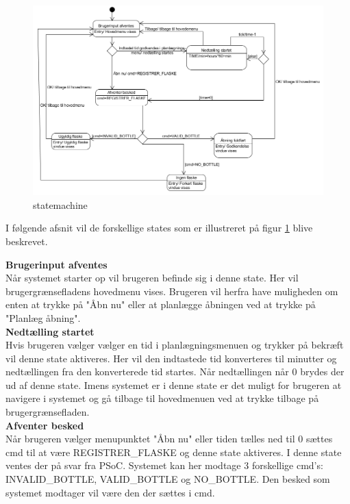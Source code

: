 \begin{figure}[H]
	\centerline{\includegraphics[scale=1]{tex/Design/GUI/Fotos/sm}}
	\caption{statemachine}
	\label{sm}
\end{figure}

I følgende afsnit vil de forskellige states som er illustreret på figur \ref{sm} blive beskrevet.

\textbf{Brugerinput afventes}\\
Når systemet starter op vil brugeren befinde sig i denne state. Her vil brugergrænsefladens hovedmenu vises. Brugeren vil herfra have muligheden om enten at trykke på "Åbn nu" eller at planlægge åbningen ved at trykke på "Planlæg åbning".\\

\textbf{Nedtælling startet}\\
Hvis brugeren vælger vælger en tid i planlægningsmenuen og trykker på bekræft vil denne state aktiveres. Her vil den indtastede tid konverteres til minutter og nedtællingen fra den konverterede tid startes. Når nedtællingen når 0 brydes der ud af denne state. Imens systemet er i denne state er det muligt for brugeren at navigere i systemet og gå tilbage til hovedmenuen ved at trykke tilbage på brugergrænsefladen.\\

\textbf{Afventer besked}\\
Når brugeren vælger menupunktet "Åbn nu" eller tiden tælles ned til 0 sættes cmd til at være REGISTRER\_FLASKE og denne state aktiveres. I denne state ventes der på svar fra PSoC. Systemet kan her modtage 3 forskellige cmd's: INVALID\_BOTTLE, VALID\_BOTTLE og NO\_BOTTLE. Den besked som systemet modtager vil være den der sættes i cmd.\\

